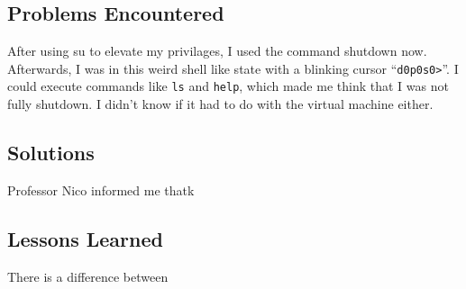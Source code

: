 \documentclass[11pt]{article}
\begin{document}
\subsection{Problems Encountered}
After using su to elevate my privilages, I used the command shutdown now. Afterwards, I was in this weird shell like state with a blinking cursor ``{\tt d0p0s0>}''. I could execute commands like {\tt ls} and {\tt help}, which made me think that I was not fully shutdown. I didn't know if it had to do with the virtual machine either.

\subsection{Solutions}
Professor Nico informed me thatk

\subsection{Lessons Learned}
There is a difference between
\end{document}
